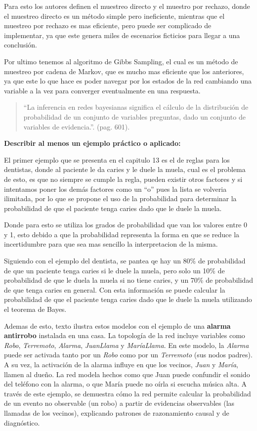 \documentclass[letterpaper,12pt]{article}
\begin{document}
Para esto los autores definen el muestreo directo y el muestro por rechazo, donde el muestreo directo es un método simple pero ineficiente, mientras que el muestreo por rechazo es mas eficiente, pero puede ser complicado de implementar, ya que este genera miles de escenarios ficticios para llegar a una conclusión.

Por ultimo tenemos al algoritmo de Gibbs Sampling, el cual es un método de muestreo por cadena de Markov, que es mucho mas eficiente que los anteriores, ya que este lo que hace es poder navegar por los estados de la red cambiando una variable a la vez para converger eventualmente en una respuesta.

\begin{quote}
    ``La inferencia en redes bayesianas significa el cálculo de la distribución de probabilidad
de un conjunto de variables preguntas, dado un conjunto de variables de
evidencia.''. (pag. 601).
\end{quote}

\textbf{Describir al menos un ejemplo práctico o aplicado:}

El primer ejemplo que se presenta en el capitulo 13 es el de reglas para los dentistas, donde al paciente le da caries y le duele la muela, cual es el problema de esto, es que no siempre se cumple la regla, pueden existir otros factores y si intentamos poner los demás factores como un ``o'' pues la lista se volveria ilimitada, por lo que se propone el uso de la probabilidad para determinar la probabilidad de que el paciente tenga caries dado que le duele la muela.

Donde para esto se utiliza los grados de probabilidad que van los valores entre 0 y 1, esto debido a que la probabilidad representa la forma en que se reduce la incertidumbre para que sea mas sencillo la interpretacion de la misma.

Siguiendo con el ejemplo del dentista, se pantea qe hay un 80\% de probabilidad de que un paciente tenga caries si le duele la muela, pero solo un 10\% de probabilidad de que le duela la muela si no tiene caries, y un 70\% de probabilidad de que tenga caries en general. Con esta información se puede calcular la probabilidad de que el paciente tenga caries dado que le duele la muela utilizando el teorema de Bayes.


Ademas de esto, texto ilustra estos modelos con el ejemplo de una \textbf{alarma antirrobo} instalada en una casa. La topología de la red incluye variables como \textit{Robo}, \textit{Terremoto}, \textit{Alarma}, \textit{JuanLlama} y \textit{MaríaLlama}. En este modelo, la \textit{Alarma} puede ser activada tanto por un \textit{Robo} como por un \textit{Terremoto} (sus nodos padres). A su vez, la activación de la alarma influye en que los vecinos, \textit{Juan} y \textit{María}, llamen al dueño. La red modela hechos como que Juan puede confundir el sonido del teléfono con la alarma, o que María puede no oírla si escucha música alta.  A través de este ejemplo, se demuestra cómo la red permite calcular la probabilidad de un evento no observable (un robo) a partir de evidencias observables (las llamadas de los vecinos), explicando patrones de razonamiento causal y de diagnóstico.
\end{document}
